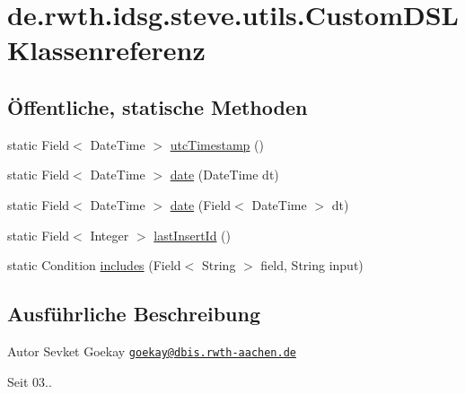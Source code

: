 \hypertarget{classde_1_1rwth_1_1idsg_1_1steve_1_1utils_1_1_custom_d_s_l}{\section{de.\-rwth.\-idsg.\-steve.\-utils.\-Custom\-D\-S\-L Klassenreferenz}
\label{classde_1_1rwth_1_1idsg_1_1steve_1_1utils_1_1_custom_d_s_l}
}
\subsection*{Öffentliche, statische Methoden}
\begin{DoxyCompactItemize}
\item 
static Field$<$ Date\-Time $>$ \hyperlink{classde_1_1rwth_1_1idsg_1_1steve_1_1utils_1_1_custom_d_s_l_a588f1723f1c9760604fb917d73e101b1}{utc\-Timestamp} ()
\item 
static Field$<$ Date\-Time $>$ \hyperlink{classde_1_1rwth_1_1idsg_1_1steve_1_1utils_1_1_custom_d_s_l_aa6bb05dc49ce963f813912301159f99c}{date} (Date\-Time dt)
\item 
static Field$<$ Date\-Time $>$ \hyperlink{classde_1_1rwth_1_1idsg_1_1steve_1_1utils_1_1_custom_d_s_l_a7bedc890a58fe9611f95388e52f9c10e}{date} (Field$<$ Date\-Time $>$ dt)
\item 
static Field$<$ Integer $>$ \hyperlink{classde_1_1rwth_1_1idsg_1_1steve_1_1utils_1_1_custom_d_s_l_ae6bda68f41bf6c60fe1c5aad640ac1bf}{last\-Insert\-Id} ()
\item 
static Condition \hyperlink{classde_1_1rwth_1_1idsg_1_1steve_1_1utils_1_1_custom_d_s_l_a6b48ccc35d19e79083fbedcc672bf5c5}{includes} (Field$<$ String $>$ field, String input)
\end{DoxyCompactItemize}


\subsection{Ausführliche Beschreibung}
\begin{DoxyAuthor}{Autor}
Sevket Goekay \href{mailto:goekay@dbis.rwth-aachen.de}{\tt goekay@dbis.\-rwth-\/aachen.\-de} 
\end{DoxyAuthor}
\begin{DoxySince}{Seit}
03.. 
\end{DoxySince}


